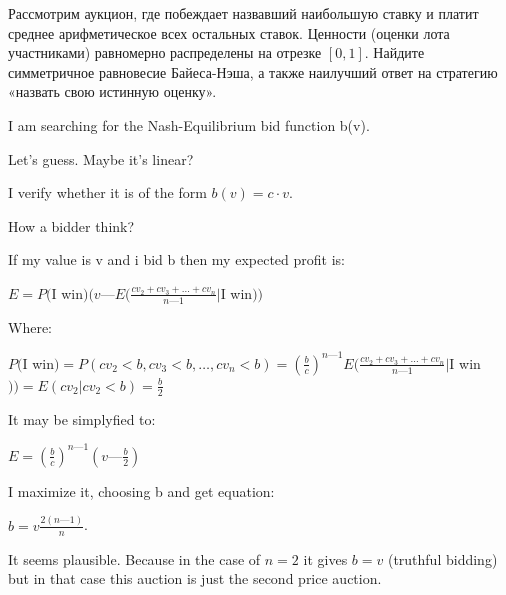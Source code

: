 \begin{problem}

Рассмотрим аукцион, где побеждает назвавший наибольшую ставку и платит среднее арифметическое всех остальных ставок. Ценности (оценки лота участниками) равномерно распределены на отрезке $[0,1]$. Найдите симметричное равновесие Байеса-Нэша, а также наилучший ответ на стратегию «назвать свою истинную оценку».

\begin{sol}

I am searching for the Nash-Equilibrium bid function b(v).

Let's guess. Maybe it's linear? \par
I verify whether it is of the form $b(v) = c\cdot v$. \par
How a bidder think? \par

If my value is v and i bid b then my expected profit is:\par
$E = P($I win$)(v — E(\frac {cv_{2} + cv_{3} + \ldots + cv_{n}}{n — 1}|$I win$))$ \par
Where:\par
$P($I win$)=P(cv_{2} < b,cv_{3} < b,\ldots,cv_{n} < b)=\left(\frac {b}{c}\right)^{n — 1}
E(\frac {cv_{2} + cv_{3} + \ldots + cv_{n}}{n — 1}|$I win$))=E(cv_{2}|cv_{2}<b)=\frac{b}{2}$\par
It may be simplyfied to:\par
$E = \left(\frac {b}{c}\right)^{n — 1}(v — \frac {b}{2})$\par
I maximize it, choosing b and get equation: \par
$b = v\frac {2(n — 1)}{n}$. \par

It seems plausible. Because in the case of $n = 2$ it gives $b = v$ (truthful bidding) but in that case this auction is just the second price auction.
\end{sol}
\end{problem}



